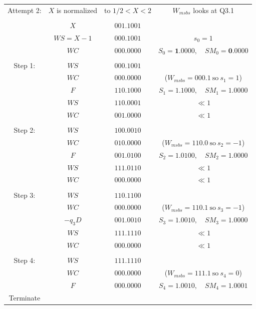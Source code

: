 \documentclass[12pt]{article}
\begin{document}
{\small
\begin{center}
\begin{tabular}{cccc}
    Attempt 2:& $X$ is normalized& to $1/2<X<2$&$W_{msbs}$ looks at Q3.1\\
    &&&\\
            &$X     $&$001.1001$&\\
            &$WS=X-1$&$000.1001$& $s_0=1$\\
            &$WC    $&$000.0000$&$S_0=\mathbf{1}.0000,\quad SM_0=\mathbf{0}.0000$ \\
    \hdashline\\
    Step 1: &$WS    $&$000.1001$&\\
            &$WC    $&$000.0000$&($W_{msbs}=000.1\ \text{so}\ s_1=1$)\\
            &$F     $&$110.1000$&$S_1=\mathbf{1.1}000,\quad SM_1=\mathbf{1.0}000$\\
    \cline{2-3}
            &$WS    $&$110.0001$&$\ll1$\\
            &$WC    $&$001.0000$&$\ll1$\\
    \hdashline\\
    Step 2: &$WS    $&$100.0010$&\\
            &$WC    $&$010.0000$&($W_{msbs}=110.0\ \text{so}\ s_2=-1$)\\
            &$F     $&$001.0100$&$S_2=\mathbf{1.01}00,\quad SM_2=\mathbf{1.00}00$\\
    \cline{2-3}
            &$WS    $&$111.0110$&$\ll1$\\
            &$WC    $&$000.0000$&$\ll1$\\
    \hdashline\\
    Step 3: &$WS    $&$110.1100$&\\
            &$WC    $&$000.0000$&($W_{msbs}=110.1\ \text{so}\ s_3=-1$)\\
            &$-q_3D $&$001.0010$&$S_3=\mathbf{1.001}0,\quad SM_3=\mathbf{1.000}0$\\
    \cline{2-3}
            &$WS    $&$111.1110$&$\ll1$\\
            &$WC    $&$000.0000$&$\ll1$\\
    \hdashline\\
    Step 4: &$WS    $&$111.1110$&\\
            &$WC    $&$000.0000$&($W_{msbs}=111.1\ \text{so}\ s_4=0$)\\
            &$F     $&$000.0000$&$S_4=\mathbf{1.0010},\quad SM_4=\mathbf{1.0001}$\\
    Terminate&&&
\end{tabular}
\end{center}
}
\end{document}
